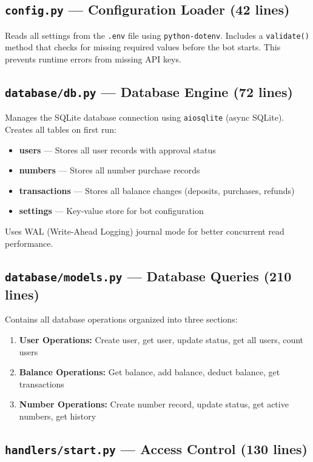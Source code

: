 \subsection{\texttt{config.py} --- Configuration Loader (42 lines)}

Reads all settings from the \texttt{.env} file using \texttt{python-dotenv}. Includes a \texttt{validate()} method that checks for missing required values before the bot starts. This prevents runtime errors from missing API keys.

\subsection{\texttt{database/db.py} --- Database Engine (72 lines)}

Manages the SQLite database connection using \texttt{aiosqlite} (async SQLite). Creates all tables on first run:
\begin{itemize}
    \item \textbf{users} --- Stores all user records with approval status
    \item \textbf{numbers} --- Stores all number purchase records
    \item \textbf{transactions} --- Stores all balance changes (deposits, purchases, refunds)
    \item \textbf{settings} --- Key-value store for bot configuration
\end{itemize}

Uses WAL (Write-Ahead Logging) journal mode for better concurrent read performance.

\subsection{\texttt{database/models.py} --- Database Queries (210 lines)}

Contains all database operations organized into three sections:
\begin{enumerate}
    \item \textbf{User Operations:} Create user, get user, update status, get all users, count users
    \item \textbf{Balance Operations:} Get balance, add balance, deduct balance, get transactions
    \item \textbf{Number Operations:} Create number record, update status, get active numbers, get history
\end{enumerate}

\subsection{\texttt{handlers/start.py} --- Access Control (130 lines)}

